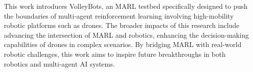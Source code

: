 This work introduces VolleyBots, an MARL testbed specifically designed to push the boundaries of multi-agent reinforcement learning involving high-mobility robotic platforms such as drones. 
The broader impacts of this research include advancing the intersection of MARL and robotics, enhancing the decision-making capabilities of drones in complex scenarios.
By bridging MARL with real-world robotic challenges, this work aims to inspire future breakthroughs in both robotics and multi-agent AI systems.



